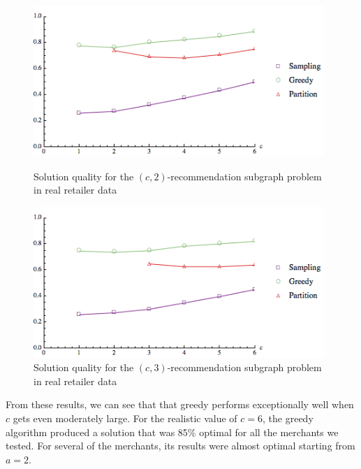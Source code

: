 \begin{figure}[t]
\hspace{0cm}
\begin{minipage}[h]{0.48\textwidth}
\centering
\includegraphics[width=0.98\textwidth]{images/real_a=2.png}
\caption{Solution quality for the $(c, 2)$-recommendation subgraph problem in real retailer data}\label{fig:real_a=2}
\end{minipage}

\hspace{0cm}
\centering
\begin{minipage}[h]{0.48\textwidth}
\centering
\includegraphics[width=0.98\textwidth]{images/real_a=3.png}
\caption{Solution quality for the $(c, 3)$-recommendation subgraph problem in real retailer data}\label{fig:real_a=3}
\end{minipage}
\end{figure} \vspace{-0.2cm}

From these results, we can see that that greedy performs exceptionally
well when $c$ gets even moderately large.  For the realistic value of
$c=6$, the greedy algorithm produced a solution that was 85\% optimal
for all the merchants we tested. For several of the merchants, its
results were almost optimal starting from $a=2$. \vs

